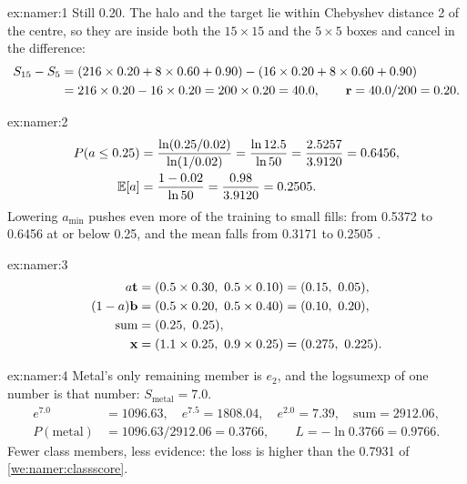 
\begin{solution}{ex:namer:1}
Still 0.20. The halo and the target lie within Chebyshev distance 2 of the centre, so they are inside both the
$15\times15$ and the $5\times5$ boxes and cancel in the difference:
\begin{align*}
S_{15}-S_5 &= (216\times0.20+8\times0.60+0.90)-(16\times0.20+8\times0.60+0.90)\\
&= 216\times0.20-16\times0.20 = 200\times0.20 = 40.0,\qquad \mathbf{r}=40.0/200=0.20 .
\end{align*}
\end{solution}

\begin{solution}{ex:namer:2}
\begin{align*}
P(a\le0.25) &= \frac{\ln(0.25/0.02)}{\ln(1/0.02)} = \frac{\ln12.5}{\ln50} = \frac{2.5257}{3.9120} = 0.6456,\\
\mathbb{E}[a] &= \frac{1-0.02}{\ln50} = \frac{0.98}{3.9120} = 0.2505 .
\end{align*}
Lowering $a_{\min}$ pushes even more of the training to small fills: from 0.5372 to 0.6456 at or below 0.25, and the
mean falls from 0.3171 to 0.2505 \tagC.
\end{solution}

\begin{solution}{ex:namer:3}
\begin{align*}
a\mathbf{t} &= (0.5\times0.30,\ 0.5\times0.10) = (0.15,\ 0.05),\\
(1-a)\mathbf{b} &= (0.5\times0.20,\ 0.5\times0.40) = (0.10,\ 0.20),\\
\text{sum} &= (0.25,\ 0.25),\\
\mathbf{x} &= (1.1\times0.25,\ 0.9\times0.25) = (0.275,\ 0.225).
\end{align*}
\end{solution}

\begin{solution}{ex:namer:4}
Metal's only remaining member is $e_2$, and the logsumexp of one number is that number: $S_{\text{metal}}=7.0$.
\begin{align*}
e^{7.0} &= 1096.63,\quad e^{7.5}=1808.04,\quad e^{2.0}=7.39,\quad \text{sum}=2912.06,\\
P(\text{metal}) &= 1096.63/2912.06 = 0.3766,\qquad L=-\ln0.3766 = 0.9766 .
\end{align*}
Fewer class members, less evidence: the loss is higher than the 0.7931 of \cref{we:namer:classscore}.
\end{solution}

